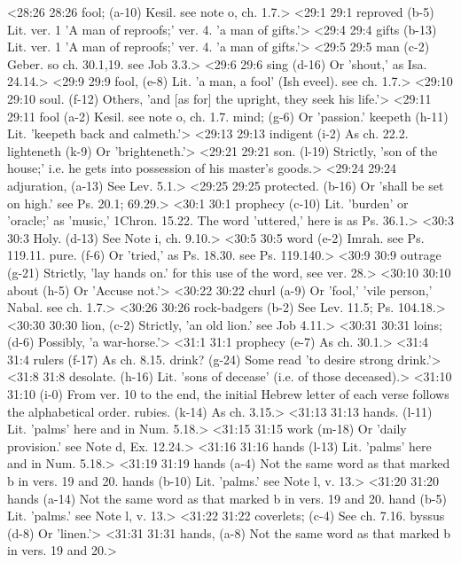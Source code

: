 <28:26 28:26  fool; (a-10)  Kesil. see note o, ch. 1.7.>
<29:1 29:1  reproved (b-5)  Lit. ver. 1 'A man of reproofs;' ver. 4. 'a man of gifts.'>
<29:4 29:4  gifts (b-13)  Lit. ver. 1 'A man of reproofs;' ver. 4. 'a man of gifts.'>
<29:5 29:5  man (c-2)  Geber. so ch. 30.1,19. see Job 3.3.>
<29:6 29:6  sing (d-16)  Or 'shout,' as Isa. 24.14.>
<29:9 29:9  fool, (e-8)  Lit. 'a man, a fool' (Ish eveel). see ch. 1.7.>
<29:10 29:10  soul. (f-12)  Others, 'and [as for] the upright, they seek his life.'>
<29:11 29:11  fool (a-2)  Kesil. see note o, ch. 1.7.
  mind; (g-6)  Or 'passion.'
  keepeth (h-11)  Lit. 'keepeth back and calmeth.'>
<29:13 29:13  indigent (i-2)  As ch. 22.2.
  lighteneth (k-9)  Or 'brighteneth.'>
<29:21 29:21  son. (l-19)  Strictly, 'son of the house;' i.e. he gets into possession of  his master's goods.>
<29:24 29:24  adjuration, (a-13)  See Lev. 5.1.>
<29:25 29:25  protected. (b-16)  Or 'shall be set on high.' see Ps. 20.1; 69.29.>
<30:1 30:1  prophecy (c-10)  Lit. 'burden' or 'oracle;' as 'music,' 1Chron. 15.22. The  word 'uttered,' here is as Ps. 36.1.>
<30:3 30:3  Holy. (d-13)  See Note i, ch. 9.10.>
<30:5 30:5  word (e-2)  Imrah. see Ps. 119.11.
  pure. (f-6)  Or 'tried,' as Ps. 18.30. see Ps. 119.140.>
<30:9 30:9  outrage (g-21)  Strictly, 'lay hands on.' for this use of the word, see ver. 28.>
<30:10 30:10  about (h-5)  Or 'Accuse not.'>
<30:22 30:22  churl (a-9)  Or 'fool,' 'vile person,' Nabal. see ch. 1.7.>
<30:26 30:26  rock-badgers (b-2)  See Lev. 11.5; Ps. 104.18.>
<30:30 30:30  lion, (c-2)  Strictly, 'an old lion.' see Job 4.11.>
<30:31 30:31  loins; (d-6)  Possibly, 'a war-horse.'>
<31:1 31:1  prophecy (e-7)  As ch. 30.1.>
<31:4 31:4  rulers (f-17)  As ch. 8.15.
  drink? (g-24)  Some read 'to desire strong drink.'>
<31:8 31:8  desolate. (h-16)  Lit. 'sons of decease' (i.e. of those deceased).>
<31:10 31:10   (i-0)  From ver. 10 to the end, the initial Hebrew letter of each  verse follows the alphabetical order.
  rubies. (k-14)  As ch. 3.15.>
<31:13 31:13  hands. (l-11) Lit. 'palms' here and in Num. 5.18.>
<31:15 31:15  work (m-18)  Or 'daily provision.' see Note d, Ex. 12.24.>
<31:16 31:16  hands (l-13)  Lit. 'palms' here and in Num. 5.18.>
<31:19 31:19  hands (a-4) Not the same word as that marked b in vers. 19 and 20.
  hands (b-10) Lit. 'palms.' see Note l, v. 13.>
<31:20 31:20  hands (a-14) Not the same word as that marked b in vers. 19 and 20.
  hand (b-5)  Lit. 'palms.' see Note l, v. 13.>
<31:22 31:22  coverlets; (c-4)  See ch. 7.16.
  byssus (d-8)  Or 'linen.'>
<31:31 31:31  hands, (a-8)  Not the same word as that marked b in vers. 19 and 20.>
